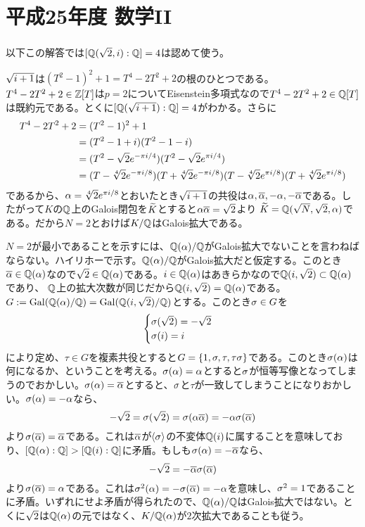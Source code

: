 \section{平成25年度 数学II}

\subsubsection{}%
\begin{sol}
  以下この解答では$[{\mathbb Q}(\sqrt{2},i): {\mathbb Q}]=4$は認めて使う。

$\sqrt{i+1}$は$(T^2-1)^2 + 1=T^4 - 2T^2 +2$の根のひとつである。$T^4 - 2T^2 +2 \in {\mathbb Z}[T]$は$p=2$についてEisenstein多項式なので$T^4 - 2T^2 +2 \in {\mathbb Q}[T]$は既約元である。とくに$[{\mathbb Q}(\sqrt{i+1}):{\mathbb Q}]=4$がわかる。さらに
\begin{align*}
  T^4 - 2T^2 +2 &= (T^2 -1)^2 + 1 \\
  &= (T^2 - 1 + i)(T^2 - 1 - i) \\
  &= (T^2 - \sqrt{2} e^{- \pi i/4} )(T^2 - \sqrt{2} e^{\pi i/4} ) \\
  &= (T - \sqrt[4]{2} e^{- \pi i/8} )(T + \sqrt[4]{2} e^{- \pi i/8} )(T - \sqrt[4]{2} e^{\pi i/8} )(T + \sqrt[4]{2} e^{ \pi i/8} )
\end{align*}
であるから、${\alpha} = \sqrt[4]{2} e^{\pi i/8}$とおいたとき$\sqrt{i+1}$の共役は${\alpha}, \overline{{\alpha}},- {\alpha}, - \overline{{\alpha}} $である。したがって$K$の${\mathbb Q}$上のGalois閉包を$\widetilde{K}$とすると${\alpha} \overline{{\alpha}} = \sqrt{2}$より
$\widetilde{K} = {\mathbb Q}(\sqrt{N}, \sqrt{2}, {\alpha})$である。だから$N=2$とおけば$K/{\mathbb Q}$はGalois拡大である。

$N=2$が最小であることを示すには、${\mathbb Q}({\alpha})/{\mathbb Q}$がGalois拡大でないことを言わねばならない。ハイリホーで示す。${\mathbb Q}({\alpha})/{\mathbb Q}$がGalois拡大だと仮定する。このとき$\overline{{\alpha}} \in {\mathbb Q}({\alpha})$なので$\sqrt{2} \in {\mathbb Q}({\alpha})$である。$i \in {\mathbb Q}({\alpha})$はあきらかなので${\mathbb Q}(i, \sqrt{2}) \subset {\mathbb Q}({\alpha})$であり、
${\mathbb Q}$上の拡大次数が同じだから${\mathbb Q}(i, \sqrt{2}) = {\mathbb Q}({\alpha})$である。$G := \operatorname{Gal}({\mathbb Q}({\alpha})/ {\mathbb Q}) = \operatorname{Gal}({\mathbb Q}(i, \sqrt{2}) / {\mathbb Q})$とする。このとき${\sigma} \in G$を
\[
\begin{cases}
  {\sigma}(\sqrt{2}) = - \sqrt{2} \\
  {\sigma}(i) = i
\end{cases}
\]
により定め、$\tau \in G$を複素共役とすると$G = \{1, {\sigma} , \tau , \tau {\sigma} \}$である。このとき${\sigma}({\alpha})$は何になるか、ということを考える。${\sigma}({\alpha}) = {\alpha}$とすると${\sigma}$が恒等写像となってしまうのでおかしい。${\sigma}({\alpha}) = \overline{{\alpha}}$とすると、${\sigma}$と$\tau$が一致してしまうことになりおかしい。${\sigma}({\alpha}) = - {\alpha}$なら、
\[
- \sqrt{2} = {\sigma}( \sqrt{2} ) = {\sigma}( {\alpha} \overline{{\alpha}} ) = - {\alpha} {\sigma}( \overline{{\alpha}} )
\]
より${\sigma}(\overline{{\alpha}}) = \overline{{\alpha}} $である。これは$\overline{{\alpha}}$が$\langle {\sigma} \rangle$の不変体${\mathbb Q}(i)$に属することを意味しており、$[{\mathbb Q}({\alpha}):{\mathbb Q}] > [{\mathbb Q}(i): {\mathbb Q}]$に矛盾。もしも${\sigma}({\alpha}) = - \overline{{\alpha}}$なら、
\[
- \sqrt{2} =  - \overline{{\alpha}} {\sigma}( \overline{{\alpha}} )
\]
より${\sigma}(\overline{{\alpha}}) = {\alpha}$である。これは${\sigma}^2({\alpha}) = - {\sigma}(\overline{{\alpha}}) = - {\alpha}$を意味し、${\sigma}^2 = 1$であることに矛盾。いずれにせよ矛盾が得られたので、${\mathbb Q}({\alpha})/{\mathbb Q}$はGalois拡大ではない。とくに$\sqrt{2}$は${\mathbb Q}({\alpha})$の元ではなく、$K/{\mathbb Q}({\alpha})$が$2$次拡大であることも従う。


\end{sol}
